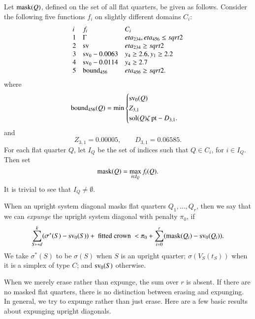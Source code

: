 \begin{definition}
Let ${\operatorname{mask}}(Q)$, defined on the set of all flat quarters, be
given as follows.  Consider the following five functions
$f_i$ on slightly different domains $C_i$:
$$
\begin{array}{llll}
  i & f_i & C_i \\
  1 & \Gamma{}{}   & eta_{234},eta_{456}\le sqrt2\\
  2 & {\operatorname{sv}} & eta_{234}\ge sqrt2\\
  3 & {\operatorname{sv}}_0 - 0.0063 & y_4\ge 2.6, y_1\ge 2.2\\
  4 & {\operatorname{sv}}_0 - 0.0114 & y_4 \ge 2.7\\
  5 & {\operatorname{bound}}_{456} & eta_{456}\ge sqrt2.\\
  \end{array}
$$
where
  $$
  {\operatorname{bound}}_{456}(Q) = \min
  \begin{cases}
  {\operatorname{sv}}_0(Q) &\\
  Z_{3,1} &\\
  {\operatorname{sol}}(Q)\zeta\,{\operatorname{pt}} - D_{3,1}.&\\
  \end{cases}
  $$
and
  $$
  Z_{3,1} = 0.00005,\qquad  D_{3,1} = 0.06585.
  $$
For each flat quarter $Q$, let $I_Q$ be the set of indices such
that $Q\in C_i$, for $i\in I_Q$.  Then set
  $$
  {\operatorname{mask}}(Q) = \max_{i\in I_Q} f_i(Q).
  $$
It is trivial to see that $I_Q\ne\emptyset$.
\end{definition}


\begin{definition}[expunge]
When an upright system diagonal 
masks flat quarters $Q_1,\ldots,Q_r$,
then we say that we can {\it expunge} the upright system diagonal with penalty $\pi_0$, if 
  $$
  \sum_{S\mapsto d}^k (\sigma^*(S) -{\operatorname{sv}}_0(S))  + \text{ fitted crown }
  < \pi_0 
   +\sum_{i=0}^r ({\operatorname{mask}}(Q_i) - {\operatorname{sv}}_0(Q_i)).
  $$
We take $\sigma^*(S)$ to be $\sigma(S)$ when $S$ is an upright quarter; $\sigma(V_S(t_S))$ when it is a simplex of type $C$; and ${\operatorname{sv}}_0(S)$ otherwise.
\end{definition}

When we merely erase rather than expunge, the sum over $r$ is absent. 
If there are no masked flat quarters,  there is no distinction between erasing and expunging.   In general, we try to expunge rather than just erase.
Here are a few basic results about expunging upright diagonals.

